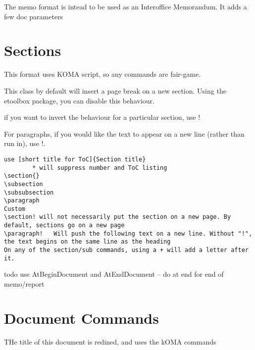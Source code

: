 \documentclass{corpboreport}
\begin{document}
The memo format is intead to be used as an Interoffice Memorandum. It adds a few doc parameters

\section{Sections}

This format uses KOMA script, so any commands are fair-game.

This class by default will insert a page break on a new section.
Using the etoolbox package, you can disable this behaviour.

if you want to invert the behaviour for a particular section, use !

For paragraphs, if you would like the text to appear on a new line (rather than run in), use !.

\lstset{language=tex}
\begin{lstlisting}
use [short title for ToC]{Section title}
		* will suppress number and ToC listing
\section{}
\subsection
\subsubsection
\paragraph
Custom
\section! will not necessarily put the section on a new page. By default, sections go on a new page
\paragraph!   Will push the following text on a new line. Without "!", the text begins on the same line as the heading
On any of the section/sub commands, using a + will add a letter after it.
\end{lstlisting}


todo use AtBeginDocument and AtEndDocument -- do at end for  end of memo/report

\section{Document Commands}
THe title of this document is redined, and uses the kOMA commands
\end{document}
